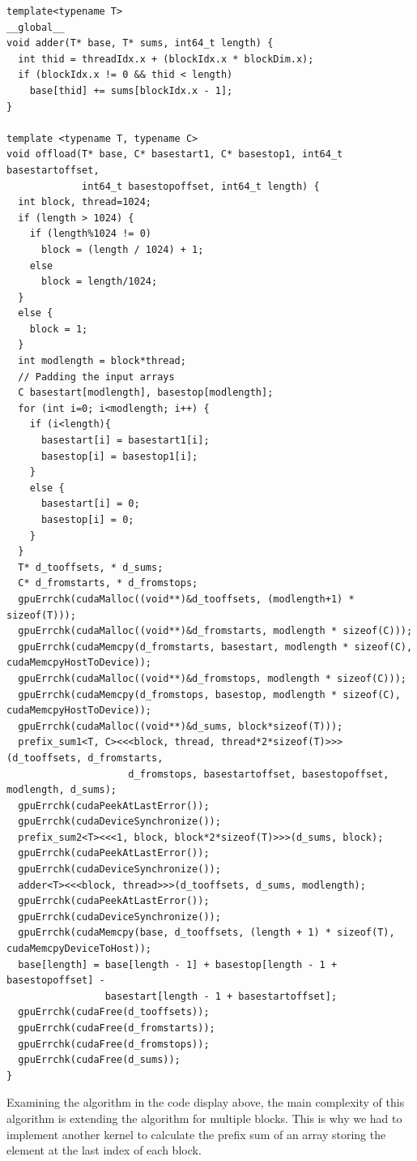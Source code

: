 \documentclass{article}
\begin{document}
\begin{mdframed}[backgroundcolor=light-gray, roundcorner=10pt,leftmargin=0.5, rightmargin=0.5, innertopmargin=5,innerbottommargin=5, outerlinewidth=1, linecolor=light-gray]
\begin{verbatim}
template<typename T>
__global__
void adder(T* base, T* sums, int64_t length) {
  int thid = threadIdx.x + (blockIdx.x * blockDim.x);
  if (blockIdx.x != 0 && thid < length)
    base[thid] += sums[blockIdx.x - 1];
}

template <typename T, typename C>
void offload(T* base, C* basestart1, C* basestop1, int64_t basestartoffset, 
             int64_t basestopoffset, int64_t length) {
  int block, thread=1024;
  if (length > 1024) {
    if (length%1024 != 0)
      block = (length / 1024) + 1;
    else
      block = length/1024;
  }
  else {
    block = 1;
  }
  int modlength = block*thread;
  // Padding the input arrays
  C basestart[modlength], basestop[modlength];
  for (int i=0; i<modlength; i++) {
    if (i<length){
      basestart[i] = basestart1[i];
      basestop[i] = basestop1[i];
    }
    else {
      basestart[i] = 0;
      basestop[i] = 0;
    }
  }
  T* d_tooffsets, * d_sums;
  C* d_fromstarts, * d_fromstops;
  gpuErrchk(cudaMalloc((void**)&d_tooffsets, (modlength+1) * sizeof(T)));
  gpuErrchk(cudaMalloc((void**)&d_fromstarts, modlength * sizeof(C)));
  gpuErrchk(cudaMemcpy(d_fromstarts, basestart, modlength * sizeof(C), cudaMemcpyHostToDevice));
  gpuErrchk(cudaMalloc((void**)&d_fromstops, modlength * sizeof(C)));
  gpuErrchk(cudaMemcpy(d_fromstops, basestop, modlength * sizeof(C), cudaMemcpyHostToDevice));
  gpuErrchk(cudaMalloc((void**)&d_sums, block*sizeof(T)));
  prefix_sum1<T, C><<<block, thread, thread*2*sizeof(T)>>>(d_tooffsets, d_fromstarts, 
                     d_fromstops, basestartoffset, basestopoffset, modlength, d_sums);
  gpuErrchk(cudaPeekAtLastError());
  gpuErrchk(cudaDeviceSynchronize());
  prefix_sum2<T><<<1, block, block*2*sizeof(T)>>>(d_sums, block);
  gpuErrchk(cudaPeekAtLastError());
  gpuErrchk(cudaDeviceSynchronize());
  adder<T><<<block, thread>>>(d_tooffsets, d_sums, modlength);
  gpuErrchk(cudaPeekAtLastError());
  gpuErrchk(cudaDeviceSynchronize());
  gpuErrchk(cudaMemcpy(base, d_tooffsets, (length + 1) * sizeof(T), cudaMemcpyDeviceToHost));
  base[length] = base[length - 1] + basestop[length - 1 + basestopoffset] - 
                 basestart[length - 1 + basestartoffset];
  gpuErrchk(cudaFree(d_tooffsets));
  gpuErrchk(cudaFree(d_fromstarts));
  gpuErrchk(cudaFree(d_fromstops));
  gpuErrchk(cudaFree(d_sums));
}
\end{verbatim}
\end{mdframed}

Examining the algorithm in the code display above, the main complexity of this algorithm is extending the algorithm for multiple blocks. This is why we had to implement another kernel to calculate the prefix sum of an array storing the element at the last index of each block.
\end{document}
